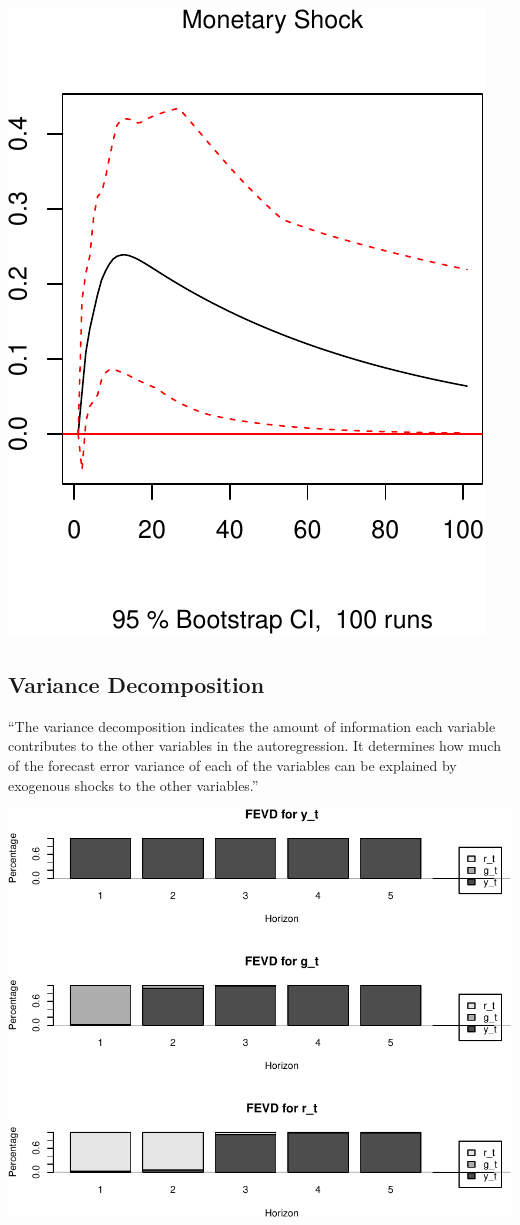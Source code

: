 \documentclass[11pt,preprint, authoryear]{elsarticle}
\numberwithin{equation}{section}
\numberwithin{figure}{section}
\numberwithin{table}{section}
\begin{document}
\includegraphics{TS_proj_files/figure-latex/unnamed-chunk-20-3.pdf}

\hypertarget{variance-decomposition}{%
\subsection{Variance Decomposition}\label{variance-decomposition}}

``The variance decomposition indicates the amount of information each
variable contributes to the other variables in the autoregression. It
determines how much of the forecast error variance of each of the
variables can be explained by exogenous shocks to the other variables.''

\includegraphics{TS_proj_files/figure-latex/unnamed-chunk-21-1.pdf}
\end{document}
